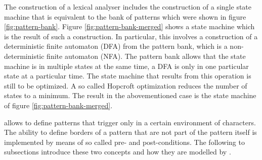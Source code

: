 
	
The construction of a lexical analyser includes the construction of a single
state machine that is equivalent to the bank of patterns which were shown in
figure \ref{fig:pattern-bank}. Figure \ref{fig:pattern-bank-merged} shows a
state machine which is the result of such a construction. In particular, this
involves a construction of a deterministic finite automaton (DFA) from the
pattern bank, which is a non-deterministic finite automaton (NFA). The pattern
bank allows that the state machine is in multiple states at the same time, a
DFA is only in one particular state at a particular time. The state machine
that results from this operation is still to be optimized. A so called Hopcroft
optimization \cite{} reduces the number of states to a minimum. The result in
the abovementioned case is the state machine of figure \ref{fig:pattern-bank-merged}.

{\Quex} allows to define patterns that trigger only in a certain environment of
characters. The ability to define borders of a pattern that are not part
of the pattern itself is implemented by means of  so called pre- and
      post-conditions. The following to subsections introduce these two
      concepts and how they are modelled by {{\quex}}.


	  
      

